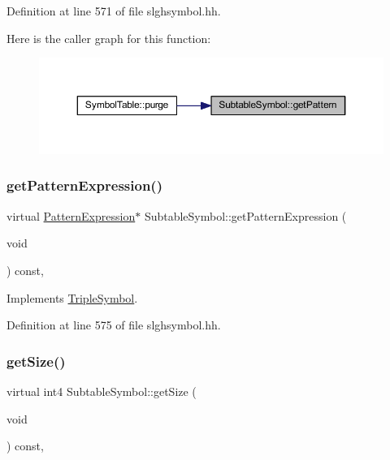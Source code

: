 Definition at line 571 of file slghsymbol.\+hh.

Here is the caller graph for this function\+:
\nopagebreak
\begin{figure}[H]
\begin{center}
\leavevmode
\includegraphics[width=350pt]{class_subtable_symbol_a131d57e0a974bd170fa21fe64c3bc4b0_icgraph}
\end{center}
\end{figure}
\mbox{\label{class_subtable_symbol_a103ecc93b2b3fe1a5db3edef893a4d5b}} 
\subsubsection{\texorpdfstring{getPatternExpression()}{getPatternExpression()}}
{\footnotesize\ttfamily virtual \mbox{\hyperlink{class_pattern_expression}{Pattern\+Expression}}$\ast$ Subtable\+Symbol\+::get\+Pattern\+Expression (\begin{DoxyParamCaption}\item[{void}]{ }\end{DoxyParamCaption}) const\hspace{0.3cm}{\ttfamily [inline]}, {\ttfamily [virtual]}}



Implements \mbox{\hyperlink{class_triple_symbol_a213895658c5fe547edf9ac54a1d2de2e}{Triple\+Symbol}}.



Definition at line 575 of file slghsymbol.\+hh.

\mbox{\label{class_subtable_symbol_a34643b05651a29f4568b69aa208b1e3a}} 
\subsubsection{\texorpdfstring{getSize()}{getSize()}}
{\footnotesize\ttfamily virtual int4 Subtable\+Symbol\+::get\+Size (\begin{DoxyParamCaption}\item[{void}]{ }\end{DoxyParamCaption}) const\hspace{0.3cm}{\ttfamily [inline]}, {\ttfamily [virtual]}}



